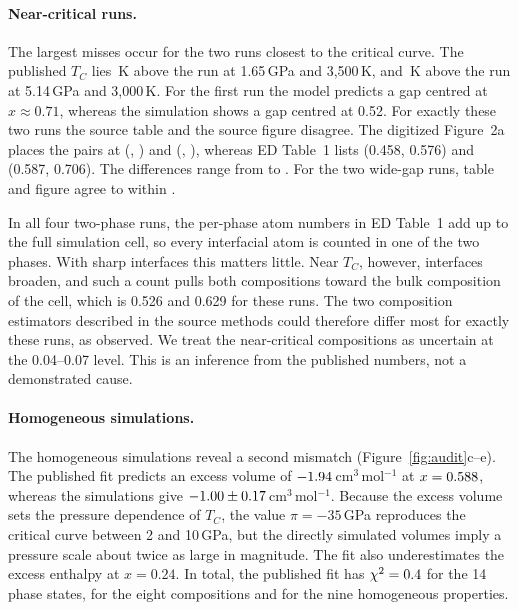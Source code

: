 \paragraph{Near-critical runs.} The largest misses occur for the two runs closest to the
critical curve. The published $T_C$ lies \tcAboveRunNearCritLow{}\,K above the run at
1.65\,GPa and 3,500\,K, and \tcAboveRunNearCritHigh{}\,K above the run at 5.14\,GPa and
3,000\,K. For the first run the model predicts a gap centred at $x \approx 0.71$, whereas the
simulation shows a gap centred at 0.52. For exactly these two runs the source table and the
source figure disagree. The digitized Figure~2a places the pairs at
(\figLoOneSixFive{}, \figHiOneSixFive{}) and (\figLoFiveOneFour{}, \figHiFiveOneFour{}),
whereas ED Table~1 lists (0.458, 0.576) and (0.587, 0.706). The differences range from
\diffLoFiveOneFour{} to \diffHiOneSixFive{}. For the two wide-gap runs, table and figure agree
to within \digMarker{}.

In all four two-phase runs, the per-phase atom numbers in ED Table~1 add up to the full
simulation cell, so every interfacial atom is counted in one of the two phases. With sharp
interfaces this matters little. Near $T_C$, however, interfaces broaden, and such a count
pulls both compositions toward the bulk composition of the cell, which is 0.526 and 0.629 for
these runs. The two composition estimators described in the source methods
\cite{gilmore2026} could therefore differ most for exactly these runs, as observed. We treat
the near-critical compositions as uncertain at the 0.04--0.07 level. This is an inference from
the published numbers, not a demonstrated cause.

\paragraph{Homogeneous simulations.} The homogeneous simulations reveal a second mismatch
(Figure~\ref{fig:audit}c--e). The published fit predicts an excess volume of
$-1.94$\,cm$^3$\,mol$^{-1}$ at $x = 0.588{}$, whereas the simulations give
$-1.00 \pm 0.17$\,cm$^3$\,mol$^{-1}$. Because the excess volume sets the pressure dependence of $T_C$,
the value $\pi = -35$\,GPa reproduces the critical curve between 2 and 10\,GPa, but the
directly simulated volumes imply a pressure scale about twice as large in magnitude. The fit
also underestimates the excess enthalpy at $x = 0.24$. In total, the published fit has
$\chi^2 = 0.4{}$ for the 14 phase states, \pubChiComp{} for the eight compositions
and \pubChiHom{} for the nine homogeneous properties.

